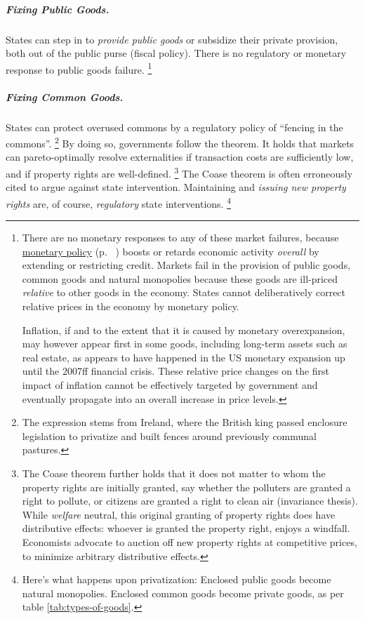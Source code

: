 \subparagraph{Fixing Public Goods.}  \label{sec:public-good-response} States can step in to \emph{provide public goods} or subsidize their private provision, both out of the public purse (fiscal policy).
There is no regulatory or monetary response to public goods failure.
\footnote{
	 \label{fn:monetary-commons}
	There are no monetary responses to any of these market failures, because \hyperref[sec:monetary]{monetary policy} (p.~ \pageref{sec:monetary}) boosts or retards economic activity \emph{overall} by extending or restricting credit. Markets fail in the provision of public goods, common goods and natural monopolies because these goods are ill-priced \emph{relative} to other goods in the economy.
	States cannot deliberatively correct relative prices in the economy by monetary policy.

	Inflation, if and to the extent that it is caused by monetary overexpansion, may however appear first in some goods, including long-term assets such as real estate, as appears to have happened in the US monetary expansion up until the 2007ff financial crisis.
	These relative price changes on the first impact of inflation cannot be effectively targeted by government and eventually propagate into an overall increase in price levels.
}

\subparagraph{Fixing Common Goods.}  \label{sec:common-goodresponse} States can protect overused commons by a regulatory policy of ``fencing in the commons''.
\footnote{
	The expression stems from Ireland, where the British king passed enclosure legislation to privatize and built fences around previously communal pastures.
}
By doing so, governments follow the \cite{Coase1960} theorem.
It holds that markets can pareto-optimally resolve externalities if transaction costs are sufficiently low, and if property rights are well-defined.
\footnote{
	The Coase theorem further holds that it does not matter to whom the property rights are initially granted, say whether the polluters are granted a right to pollute, or citizens are granted a right to clean air (invariance thesis). While \emph{welfare} neutral, this original granting of property rights does have distributive effects: whoever is granted the property right, enjoys a windfall. Economists advocate to auction off new property rights at competitive prices, to minimize arbitrary distributive effects.
}
The Coase theorem is often erroneously cited to argue against state intervention.
Maintaining and \emph{issuing new property rights} are, of course, \emph{regulatory} state interventions.
\footnote{
	Here's what happens upon privatization: Enclosed public goods become natural monopolies. Enclosed common goods become private goods, as per table \ref{tab:types-of-goods}.
}

